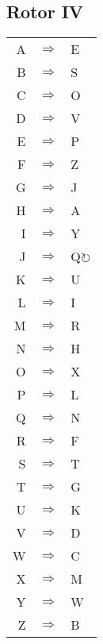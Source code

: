 \begin{multicols}{2}
\subsection{Rotor IV}
\begin{supertabular}{rcl}
A & $\Rightarrow$ & E \\
B & $\Rightarrow$ & S \\
C & $\Rightarrow$ & O \\
D & $\Rightarrow$ & V \\
E & $\Rightarrow$ & P \\
F & $\Rightarrow$ & Z \\
G & $\Rightarrow$ & J \\
H & $\Rightarrow$ & A \\
I & $\Rightarrow$ & Y \\
J & $\Rightarrow$ & Q$\circlearrowright$ \\
K & $\Rightarrow$ & U \\
L & $\Rightarrow$ & I \\
M & $\Rightarrow$ & R \\
N & $\Rightarrow$ & H \\
O & $\Rightarrow$ & X \\
P & $\Rightarrow$ & L \\
Q & $\Rightarrow$ & N \\
R & $\Rightarrow$ & F \\
S & $\Rightarrow$ & T \\
T & $\Rightarrow$ & G \\
U & $\Rightarrow$ & K \\
V & $\Rightarrow$ & D \\
W & $\Rightarrow$ & C \\
X & $\Rightarrow$ & M \\
Y & $\Rightarrow$ & W \\
Z & $\Rightarrow$ & B \\
\end{supertabular}


\end{multicols}
